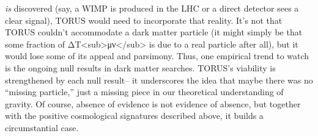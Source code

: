 \documentclass[]{article}
\begin{document}
\begin{itemize}
  \emph{is} discovered (say, a WIMP is produced in the LHC or a direct
  detector sees a clear signal), TORUS would need to incorporate that
  reality. It's not that TORUS couldn't accommodate a dark matter
  particle (it might simply be that some fraction of
  ΔT\textless{}sub\textgreater{}μν\textless{}/sub\textgreater{} is due
  to a real particle after all), but it would lose some of its appeal
  and parsimony. Thus, one empirical trend to watch is the ongoing null
  results in dark matter searches. TORUS's viability is strengthened by
  each null result​-- it underscores the idea that maybe there was no
  ``missing particle,'' just a missing piece in our theoretical
  understanding of gravity. Of course, absence of evidence is not
  evidence of absence, but together with the positive cosmological
  signatures described above, it builds a circumstantial case.
\end{itemize}
\end{document}
